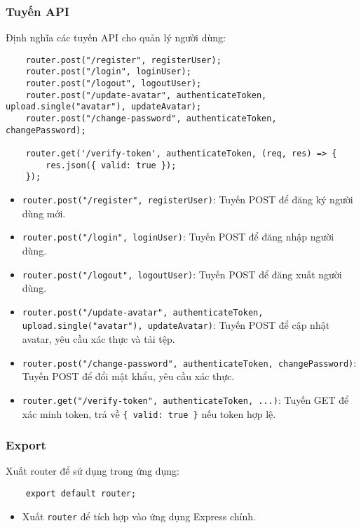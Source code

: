             \subsubsection{Tuyến API}
                \hspace*{0.6cm}Định nghĩa các tuyến API cho quản lý người dùng:
                \begin{lstlisting}
    router.post("/register", registerUser);
    router.post("/login", loginUser);
    router.post("/logout", logoutUser);
    router.post("/update-avatar", authenticateToken, upload.single("avatar"), updateAvatar);
    router.post("/change-password", authenticateToken, changePassword);

    router.get('/verify-token', authenticateToken, (req, res) => {
        res.json({ valid: true });
    });
                \end{lstlisting}
                \begin{itemize}
                    \item \texttt{router.post("/register", registerUser)}: Tuyến POST để đăng ký người dùng mới.
                    \item \texttt{router.post("/login", loginUser)}: Tuyến POST để đăng nhập người dùng.
                    \item \texttt{router.post("/logout", logoutUser)}: Tuyến POST để đăng xuất người dùng.
                    \item \texttt{router.post("/update-avatar", authenticateToken, upload.single("avatar"), updateAvatar)}: Tuyến POST để cập nhật avatar, yêu cầu xác thực và tải tệp.
                    \item \texttt{router.post("/change-password", authenticateToken, changePassword)}: Tuyến POST để đổi mật khẩu, yêu cầu xác thực.
                    \item \texttt{router.get("/verify-token", authenticateToken, ...)}: Tuyến GET để xác minh token, trả về \texttt{\{ valid: true \}} nếu token hợp lệ.
                \end{itemize}

            \subsubsection{Export}
                \hspace*{0.6cm}Xuất router để sử dụng trong ứng dụng:
                \begin{lstlisting}
    export default router;
                \end{lstlisting}
                \begin{itemize}
                    \item Xuất \texttt{router} để tích hợp vào ứng dụng Express chính.
                \end{itemize}

